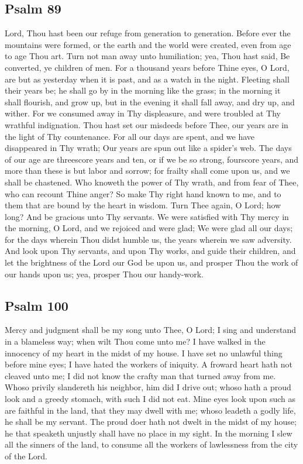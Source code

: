 \subsection{Psalm 89}

Lord, Thou hast been our refuge from generation to generation. Before ever the mountains were formed, or the earth and the world were created, even from age to age Thou art. Turn not man away unto humiliation; yea, Thou hast said, Be converted, ye children of men. For a thousand years before Thine eyes, O Lord, are but as yesterday when it is past, and as a watch in the night. Fleeting shall their years be; he shall go by in the morning like the grass; in the morning it shall flourish, and grow up, but in the evening it shall fall away, and dry up, and wither. For we consumed away in Thy displeasure, and were troubled at Thy wrathful indignation. Thou hast set our misdeeds before Thee, our years are in the light of Thy countenance. For all our days are spent, and we have disappeared in Thy wrath; Our years are spun out like a spider’s web. The days of our age are threescore years and ten, or if we be so strong, fourscore years, and more than these is but labor and sorrow; for frailty shall come upon us, and we shall be chastened. Who knoweth the power of Thy wrath, and from fear of Thee, who can recount Thine anger? So make Thy right hand known to me, and to them that are bound by the heart in wisdom. Turn Thee again, O Lord; how long? And be gracious unto Thy servants. We were satisfied with Thy mercy in the morning, O Lord, and we rejoiced and were glad; We were glad all our days; for the days wherein Thou didst humble us, the years wherein we saw adversity. And look upon Thy servants, and upon Thy works, and guide their children, and let the brightness of the Lord our God be upon us, and prosper Thou the work of our hands upon us; yea, prosper Thou our handy-work.

\subsection{Psalm 100}

Mercy and judgment shall be my song unto Thee, O Lord; I sing and understand in a blameless way; when wilt Thou come unto me? I have walked in the innocency of my heart in the midst of my house. I have set no unlawful thing before mine eyes; I have hated the workers of iniquity. A froward heart hath not cleaved unto me; I did not know the crafty man that turned away from me. Whoso privily slandereth his neighbor, him did I drive out; whoso hath a proud look and a greedy stomach, with such I did not eat. Mine eyes look upon such as are faithful in the land, that they may dwell with me; whoso leadeth a godly life, he shall be my servant. The proud doer hath not dwelt in the midst of my house; he that speaketh unjustly shall have no place in my sight. In the morning I slew all the sinners of the land, to consume all the workers of lawlessness from the city of the Lord.

